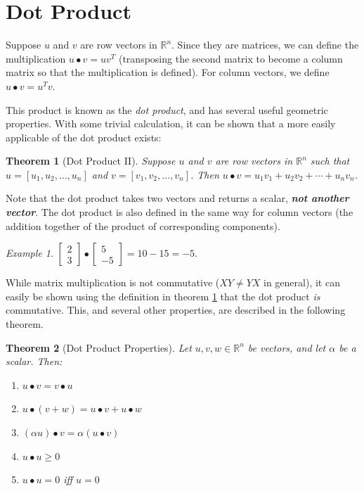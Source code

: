 \documentclass[10pt, a4paper]{amsart}
\newtheorem{thm}{Theorem}
\theoremstyle{definition}
\theoremstyle{remark}
\newtheorem{ex}{Example}
\begin{document}
\section{Dot Product}
Suppose $ u $ and $ v $ are row vectors in $ \mathbb{R}^n $. Since they are matrices, we can define
the multiplication $ u \bullet v = u v^T $ (transposing the second matrix to become a column matrix
so that the multiplication is defined). For column vectors, we define $ u \bullet v = u^T v $.

This product is known as the \emph{dot product}, and has several useful geometric properties. With
some trivial calculation, it can be shown that a more easily applicable of the dot product exists:

\begin{thm}[Dot Product II]
  Suppose $ u $ and $ v $ are row vectors in $ \mathbb{R}^n $ such that $ u = [u_1, u_2, \dots, u_n] $
  and $ v = [v_1, v_2, \dots, v_n] $. Then $ u \bullet v = u_1v_1 + u_2v_2 + \cdots + u_nv_n $.
  \label{thm:EasyDotty}
\end{thm}

Note that the dot product takes two vectors and returns a scalar, \emph{\textbf{not another vector}}. The dot
product is also defined in the same way for column vectors (the addition together of the product of corresponding
components).

\begin{ex}
  $ \begin{bmatrix} 2 \\ 3 \end{bmatrix} \bullet \begin{bmatrix} 5 \\ -5 \end{bmatrix} = 10 - 15 = -5. $
\end{ex}

While matrix multiplication is not commutative ($ XY \neq YX $ in general), it can easily be shown using
the definition in theorem \ref{thm:EasyDotty} that the dot product \emph{is} commutative. This, and
several other properties, are described in the following theorem.

\begin{thm}[Dot Product Properties]
  Let $ u, v, w \in \mathbb{R}^n $ be vectors, and let $ \alpha $ be a scalar. Then:
  \begin{enumerate}
    \item $ u \bullet v = v \bullet u $
    \item $ u \bullet (v + w) = u \bullet v + u \bullet w $
    \item $ (\alpha u) \bullet v = \alpha(u \bullet v) $
    \item $ u \bullet u \geq 0 $
    \item $ u \bullet u = 0 $ iff $ u = 0 $
  \end{enumerate}
\end{thm}
\end{document}
